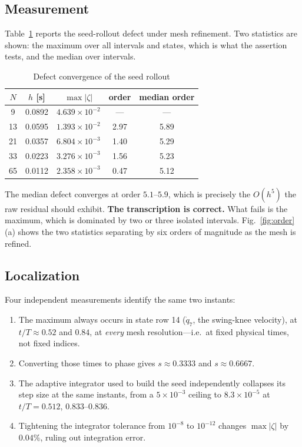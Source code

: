 \documentclass[10pt,conference]{IEEEtran}
\begin{document}
\subsection{Measurement}

Table~\ref{tab:order} reports the seed-rollout defect under mesh refinement.
Two statistics are shown: the maximum over all intervals and states, which is
what the assertion tests, and the median over intervals.

\begin{table}[t]
\caption{Defect convergence of the seed rollout}
\label{tab:order}
\centering
\begin{tabular}{ccccc}
\toprule
$N$ & $h$ [s] & $\max|\zeta|$ & order & median order \\
\midrule
9  & 0.0892 & $4.639\times10^{-2}$ & ---   & ---  \\
13 & 0.0595 & $1.393\times10^{-2}$ & 2.97 & 5.89 \\
21 & 0.0357 & $6.804\times10^{-3}$ & 1.40 & 5.29 \\
33 & 0.0223 & $3.276\times10^{-3}$ & 1.56 & 5.23 \\
65 & 0.0112 & $2.358\times10^{-3}$ & 0.47 & 5.12 \\
\bottomrule
\end{tabular}
\end{table}

The median defect converges at order $5.1$--$5.9$, which is precisely the
$O(h^5)$ the raw residual should exhibit. \textbf{The transcription is correct.}
What fails is the maximum, which is dominated by two or three isolated
intervals. Fig.~\ref{fig:order}(a) shows the two statistics separating by six
orders of magnitude as the mesh is refined.

\subsection{Localization}

Four independent measurements identify the same two instants:

\begin{enumerate}
\item The maximum always occurs in state row 14 ($\dot q_7$, the swing-knee
      velocity), at $t/T \approx 0.52$ and $0.84$, at \emph{every} mesh
      resolution---i.e.\ at fixed physical times, not fixed indices.
\item Converting those times to phase gives $s \approx 0.3333$ and
      $s \approx 0.6667$.
\item The adaptive integrator used to build the seed independently collapses its
      step size at the same instants, from a $5\times10^{-3}$ ceiling to
      $8.3\times10^{-5}$ at $t/T = 0.512$, $0.833$--$0.836$.
\item Tightening the integrator tolerance from $10^{-8}$ to $10^{-12}$ changes
      $\max|\zeta|$ by $0.04\%$, ruling out integration error.
\end{enumerate}
\end{document}
